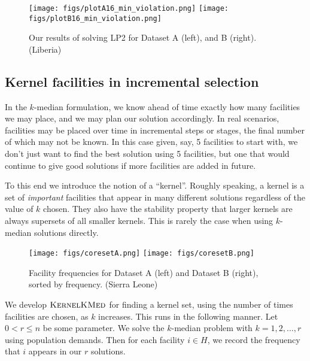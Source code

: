\begin{figure}[h]
  \centering %
    \texttt{[image: figs/plotA16\_min\_violation.png]}
	\texttt{[image: figs/plotB16\_min\_violation.png]}
\caption{Our results of solving LP2 for Dataset A (left), and B (right). (Liberia)} 
	\label{fig:LP2_AB}
\end{figure}



\subsection*{Kernel facilities in incremental selection}

In the $k$-median formulation, we know ahead of time exactly how many facilities we may place, and we may plan our solution accordingly. In real scenarios, facilities may be placed over time in incremental steps or stages, the final number of which may not be known. In this case given, say, 5 facilities to start with, we don't just want to find the best solution using 5 facilities, but one that would continue to give good solutions if more facilities are added in future.


To this end we introduce the notion of a ``kernel''. 
Roughly speaking, a kernel is a set of \textit{important} facilities that appear in many different solutions regardless of the value of $k$ chosen. They also have the stability property that larger kernels are always supersets of all smaller kernels. This is rarely the case when using $k$-median solutions directly.

\begin{figure}[h]
  \centering %
    \texttt{[image: figs/coresetA.png]}
        \texttt{[image: figs/coresetB.png]}
\caption{Facility frequencies for Dataset A (left) and Dataset B (right), sorted by frequency. (Sierra Leone)}
        \label{fig:coreset_A_and_B}
\end{figure}

We develop $\textsc{KernelKMed}$ for finding a kernel set, using the number of times facilities are chosen, as $k$ increases. This runs in the following manner.
Let $0 < r \leq n$ be some parameter. We solve the $k$-median problem with $k = 1, 2, \ldots, r$ using population demands. Then for each facility $i \in H$, we record the frequency that $i$ appears in our $r$ solutions.

